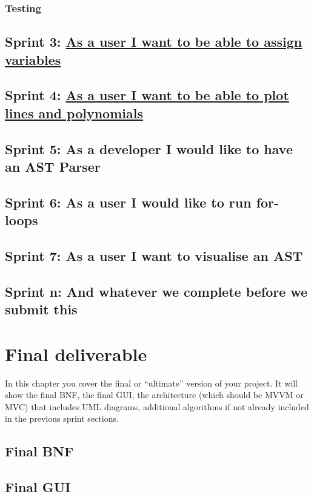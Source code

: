 \documentclass[a4paper, oneside, 11pt]{report}
\begin{document}
\subsection{Testing}

\section{Sprint 3: \href{https://liamfarese.atlassian.net/browse/AP-42}{As a user I want to be able to assign variables}}
\section{Sprint 4: \href{https://liamfarese.atlassian.net/browse/AP-50}{As a user I want to be able to plot lines and polynomials}}
\section{Sprint 5: As a developer I would like to have an AST Parser}
\section{Sprint 6: As a user I would like to run for-loops}
\section{Sprint 7: As a user I want to visualise an AST}
\section{Sprint n: And whatever we complete before we submit this}



\chapter{Final deliverable}\label{Impl}

In this chapter you cover the final or ``ultimate'' version of your project. It will show the final BNF, the final GUI, the architecture (which should be MVVM or MVC) that includes UML diagrams, additional algorithms if not already included in the previous sprint sections.

\section{Final BNF}

\section{Final GUI}
\end{document}
